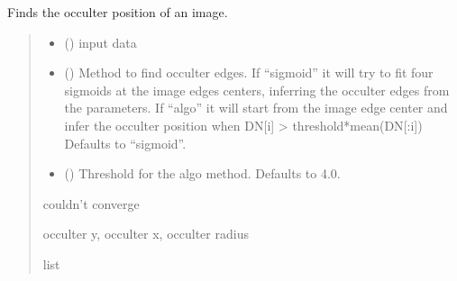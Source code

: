 \documentclass[letterpaper,10pt,english]{sphinxmanual}
\begin{document}
\begin{fulllineitems}
\label{\detokenize{micropolarray.processing:micropolarray.processing.nrgf.find_occulter_position}}
\pysigstartsignatures
{}
\pysigstopsignatures
\sphinxAtStartPar
Finds the occulter position of an image.
\begin{quote}\begin{description}
\begin{itemize}
\item {} 
\sphinxAtStartPar
{} () \textendash{} input data

\item {} 
\sphinxAtStartPar
{} (\sphinxstyleliteralemphasis{\sphinxupquote{, }}) \textendash{} Method to find occulter edges. If “sigmoid” it will try to fit four sigmoids at the image edges centers, inferring the occulter edges from the parameters. If “algo” it will start from the image edge center and infer the occulter position when DN{[}i{]} \textgreater{} threshold*mean(DN{[}:i{]}) Defaults to “sigmoid”.

\item {} 
\sphinxAtStartPar
{} (\sphinxstyleliteralemphasis{\sphinxupquote{, }}) \textendash{} Threshold for the algo method. Defaults to 4.0.

\end{itemize}

\sphinxAtStartPar
{} \textendash{} couldn’t converge

\sphinxAtStartPar
occulter y, occulter x, occulter radius

\sphinxAtStartPar
list

\end{description}\end{quote}

\end{fulllineitems}
\end{document}
